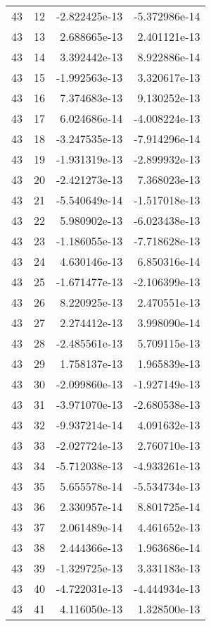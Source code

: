\begin{tabular}{rrrr}
  43 &   12 & -2.822425e-13 & -5.372986e-14 \\
  43 &   13 &  2.688665e-13 &  2.401121e-13 \\
  43 &   14 &  3.392442e-13 &  8.922886e-14 \\
  43 &   15 & -1.992563e-13 &  3.320617e-13 \\
  43 &   16 &  7.374683e-13 &  9.130252e-13 \\
  43 &   17 &  6.024686e-14 & -4.008224e-13 \\
  43 &   18 & -3.247535e-13 & -7.914296e-14 \\
  43 &   19 & -1.931319e-13 & -2.899932e-13 \\
  43 &   20 & -2.421273e-13 &  7.368023e-13 \\
  43 &   21 & -5.540649e-14 & -1.517018e-13 \\
  43 &   22 &  5.980902e-13 & -6.023438e-13 \\
  43 &   23 & -1.186055e-13 & -7.718628e-13 \\
  43 &   24 &  4.630146e-13 &  6.850316e-14 \\
  43 &   25 & -1.671477e-13 & -2.106399e-13 \\
  43 &   26 &  8.220925e-13 &  2.470551e-13 \\
  43 &   27 &  2.274412e-13 &  3.998090e-14 \\
  43 &   28 & -2.485561e-13 &  5.709115e-13 \\
  43 &   29 &  1.758137e-13 &  1.965839e-13 \\
  43 &   30 & -2.099860e-13 & -1.927149e-13 \\
  43 &   31 & -3.971070e-13 & -2.680538e-13 \\
  43 &   32 & -9.937214e-14 &  4.091632e-13 \\
  43 &   33 & -2.027724e-13 &  2.760710e-13 \\
  43 &   34 & -5.712038e-13 & -4.933261e-13 \\
  43 &   35 &  5.655578e-14 & -5.534734e-13 \\
  43 &   36 &  2.330957e-14 &  8.801725e-14 \\
  43 &   37 &  2.061489e-14 &  4.461652e-13 \\
  43 &   38 &  2.444366e-13 &  1.963686e-14 \\
  43 &   39 & -1.329725e-13 &  3.331183e-13 \\
  43 &   40 & -4.722031e-13 & -4.444934e-13 \\
  43 &   41 &  4.116050e-13 &  1.328500e-13 \\

\end{tabular}
